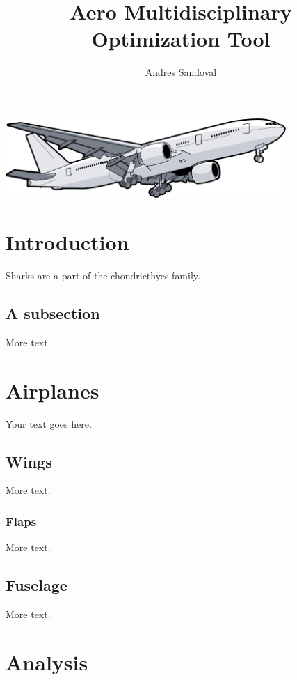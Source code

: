 \documentclass[11pt]{article} %
\title{Aero Multidisciplinary Optimization Tool}
\author{Andres Sandoval}
\begin{document}
\maketitle
\begin{center}
    \includegraphics[width=0.8\textwidth]{cover}
\end{center}

\pagebreak

\tableofcontents
 
\pagebreak

\section{Introduction}

Sharks are a part of the chondricthyes family.

\subsection{A subsection}

More text.

\section{Airplanes}

Your text goes here.

\subsection{Wings}

More text.

\subsubsection{Flaps}

More text.

\subsection{Fuselage}

More text.

\section{Analysis}
\end{document}
